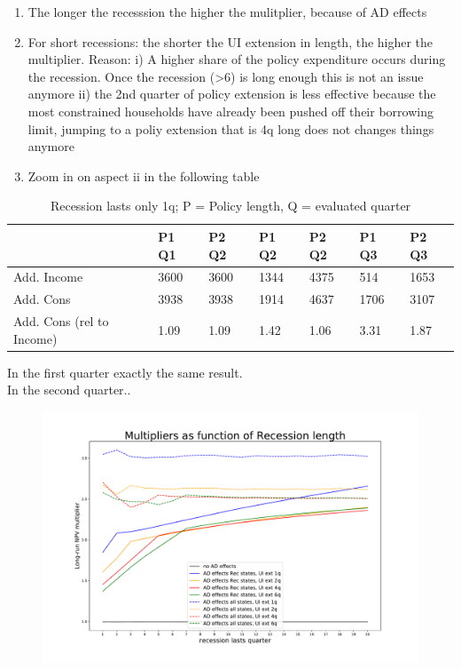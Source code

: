\documentclass[]{article}
\begin{document}
\begin{enumerate}
	\item The longer the recesssion the higher the mulitplier, because of AD effects
	\item For short recessions: the shorter the UI extension in length, the higher the multiplier. Reason: 
	i) A higher share of the policy expenditure occurs during the recession. Once the recession (>6) is long enough this is not an issue anymore
	ii) the 2nd quarter of policy extension is less effective because the most constrained households have already been pushed off their borrowing limit, jumping to a poliy extension that is 4q long does not changes things anymore
	\item Zoom in on aspect ii in the following table
\end{enumerate}

\begin{table}[htb]
	\centering
	\begin{tabular}{@{}lllllll@{}}
		\toprule
					  				& P1 Q1 & P2 Q2 & P1 Q2 & P2 Q2 &  P1 Q3 & P2 Q3 \\ \midrule
		Add. Income     			& 3600  & 3600  & 1344  & 4375  &  514   & 1653 \\
		Add. Cons    				& 3938  & 3938  & 1914  & 4637  &  1706  & 3107  \\
		Add. Cons (rel to Income)   & 1.09  & 1.09  & 1.42  & 1.06  &  3.31  & 1.87  \\ \bottomrule
	\end{tabular}	
	\caption{Recession lasts only 1q; P = Policy length, Q = evaluated quarter}
\end{table}

In the first quarter exactly the same result.\\
In the second quarter..



\begin{figure}[h]
	\centering
	\includegraphics[width=1\linewidth]{../FullRun_Apr18_AD05_AllStates_800k/Multipliers_RecLength_PolicyLength2}
	\caption{}
	\label{fig:multipliersreclengthpolicylength2}
\end{figure}
\end{document}
